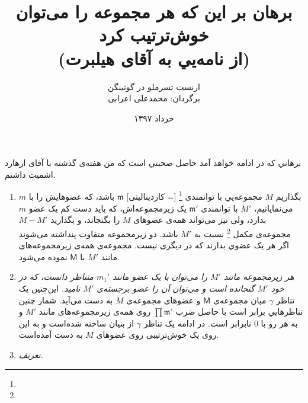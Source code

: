 \documentclass[11pt,a4paper,]{article}
\title{\textbf{برهان بر این که هر مجموعه را می‌توان خوش‌ترتیب کرد \\
(از نامه‌یي به آقای هیلبرت)}}
\author{ارنست تسرملو در گوتینگن \\ برگردان: محمدعلی اعرابی}
\date{خرداد ۱۳۹۷}
\begin{document}
\maketitle

برهاني که در ادامه خواهد آمد حاصل صحبتي است که من هفته‌ی گذشته با آقای ارهارد اشمیت داشتم.

\begin{enumerate}
\item 
بگذاریم 
$M$
مجموعه‌یي با توانمندی%
\footnote{}
[= کاردینالیتی]
$\mathfrak{m}$
باشد،
که عضوهایش را با
$m$
می‌نمایانیم،
$M'$
با توانمندی
$\mathfrak{m}'$
یک زیرمجموعه‌اش، 
که باید دست کم یک عضو
$m$
بدارد،
ولی نیز می‌تواند همه‌ی عضوهای
$M$
را بگنجاند،
و بگذارید
$M - M'$
مجموعه‌ی مکمل%
\footnote{}
نسبت به 
$M'$
باشد.
دو زیرمجموعه متفاوت پنداشته می‌شوند
اگر هر یک عضوي بدارند که در دیگری نیست.
مجموعه‌ی همه‌ی زیرمجموعه‌های مانند
$M'$
با
$\mathsf{M}$
نموده می‌شود.

\item
\textit{هر زیرمجموعه مانند 
$M'$
را می‌توان با یک عضو مانند
$m_1'$
متناظر دانست،
که در خود
$M'$
گنجانده است و می‌توان آن را عضو
برجسته‌ی
$M'$
نامید.}
این‌چنین یک تناظر
$\gamma$
میان مجموعه‌ی 
$\mathsf{M}$
و عضوهای مجموعه‌ی 
$M$
به دست می‌آید.
شمار چنین تناظرهایي برابر است با حاصل ضرب
$\prod \mathfrak{m}'$
روی همه‌ی زیرمجموعه‌های مانند
$M'$
و به هر رو با
$0$
نابرابر است.
در ادامه یک تناظر
$\gamma$
از بنیان ساخته شده‌است و به این روی یک 
خوش‌ترتیبی روی عضوهای 
$M$
به دست آمده‌است.

\item
\textit{تعریف.}


\end{enumerate}
\end{document}
